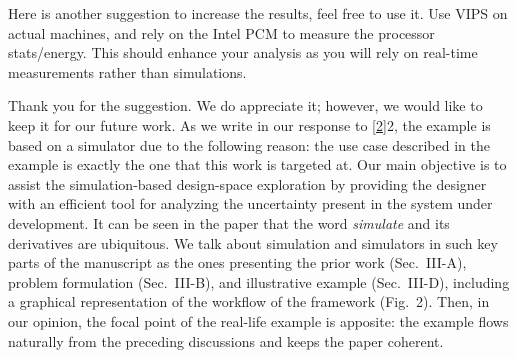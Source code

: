 \begin{reviewer}
Here is another suggestion to increase the results, feel free to use it. Use
VIPS on actual machines, and rely on the Intel PCM to measure the processor
stats/energy. This should enhance your analysis as you will rely on real-time
measurements rather than simulations.
\end{reviewer}

\begin{authors}
Thank you for the suggestion. We do appreciate it; however, we would like to
keep it for our future work. As we write in our response to \cref{2}{2}, the
example is based on a simulator due to the following reason: the use case
described in the example is exactly the one that this work is targeted at. Our
main objective is to assist the simulation-based design-space exploration by
providing the designer with an efficient tool for analyzing the uncertainty
present in the system under development. It can be seen in the paper that the
word \emph{simulate} and its derivatives are ubiquitous. We talk about
simulation and simulators in such key parts of the manuscript as the ones
presenting the prior work (Sec.~III-A), problem formulation (Sec.~III-B), and
illustrative example (Sec.~III-D), including a graphical representation of the
workflow of the framework (Fig.~2). Then, in our opinion, the focal point of the
real-life example is apposite: the example flows naturally from the preceding
discussions and keeps the paper coherent.
\end{authors}
